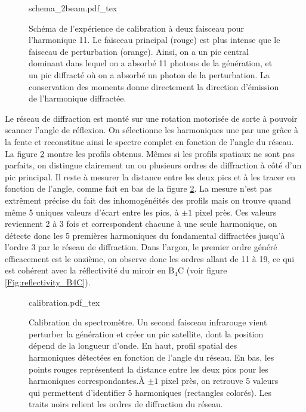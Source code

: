 \begin{figure}[!ht]
\centering
\def\svgwidth{\columnwidth}
{schema_2beam.pdf_tex}
\caption{Schéma de l'expérience de calibration à deux faisceau pour l'harmonique 11. Le faisceau principal (rouge) est plus intense que le faisceau de perturbation (orange). Ainsi, on a un pic central dominant dans lequel on a absorbé 11 photons de la génération, et un pic diffracté où on a absorbé un photon de la perturbation. La conservation des moments donne directement la direction d'émission de l'harmonique diffractée.}
\label{Fig:DiffSchema}
\end{figure}

Le réseau de diffraction est monté sur une rotation motorisée de sorte à pouvoir scanner l'angle de réflexion. On sélectionne les harmoniques une par une grâce à la fente et reconstitue ainsi le spectre complet en fonction de l'angle du réseau. La figure \ref{Fig:calibration} montre les profils obtenus. Mêmes si les profils spatiaux ne sont pas parfaits, on distingue clairement un ou plusieurs ordres de diffraction à côté d'un pic principal. Il reste à mesurer la distance entre les deux pics et à les tracer en fonction de l'angle, comme fait en bas de la figure \ref{Fig:calibration}. La mesure n'est pas extrêment précise du fait des inhomogénéités des profils mais on trouve quand même 5 uniques valeurs d'écart entre les pics, à $\pm 1$ pixel près. Ces valeurs reviennent 2 à 3 fois et correspondent chacune à une seule harmonique, on détecte donc les 5 premières harmoniques du fondamental diffractées jusqu'à l'ordre 3 par le réseau de diffraction. Dans l'argon, le premier ordre généré efficacement est le onzième, on observe donc les ordres allant de 11 à 19, ce qui est cohérent avec la réflectivité du miroir en $\mathrm{B}_\mathrm{4}\mathrm{C}$ (voir figure \ref{Fig:reflectivity_B4C}).

\begin{figure}[!ht]
\centering
\def\svgwidth{\columnwidth}
{calibration.pdf_tex}
\caption{Calibration du spectromètre. Un second faisceau infrarouge vient perturber la génération et créer un pic satellite, dont la position dépend de la longueur d'onde. En haut, profil spatial des harmoniques détectées en fonction de l'angle du réseau. En bas, les points rouges représentent la distance entre les deux pics pour les harmoniques correspondantes.\`{A} $\pm1$ pixel près, on retrouve 5 valeurs qui permettent d'identifier 5 harmoniques (rectangles colorés). Les traits noirs relient les ordres de diffraction du réseau.}
\label{Fig:calibration}
\end{figure}

